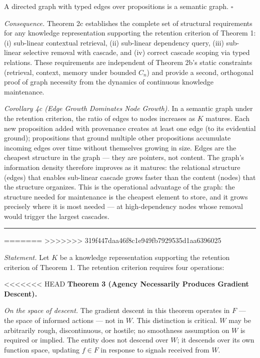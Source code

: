 \documentclass[
]{article}
\begin{document}
A directed graph with typed edges over propositions is a semantic graph.
\(\square\)

\emph{Consequence.} Theorem 2c establishes the complete set of
structural requirements for any knowledge representation supporting the
retention criterion of Theorem 1: (i) sub-linear contextual retrieval,
(ii) sub-linear dependency query, (iii) sub-linear selective removal
with cascade, and (iv) correct cascade scoping via typed relations.
These requirements are independent of Theorem 2b's static constraints
(retrieval, context, memory under bounded \(C_n\)) and provide a second,
orthogonal proof of graph necessity from the dynamics of continuous
knowledge maintenance.

\emph{Corollary 4c (Edge Growth Dominates Node Growth).} In a semantic
graph under the retention criterion, the ratio of edges to nodes
increases as \(K\) matures. Each new proposition added with provenance
creates at least one edge (to its evidential ground); propositions that
ground multiple other propositions accumulate incoming edges over time
without themselves growing in size. Edges are the cheapest structure in
the graph --- they are pointers, not content. The graph's information
density therefore improves as it matures: the relational structure
(edges) that enables sub-linear cascade grows faster than the content
(nodes) that the structure organizes. This is the operational advantage
of the graph: the structure needed for maintenance is the cheapest
element to store, and it grows precisely where it is most needed ---
at high-dependency nodes whose removal would trigger the largest
cascades.

\begin{center}\rule{0.5\linewidth}{0.5pt}\end{center}
=======
>>>>>>> 319f447daa46f8c1e949fb7929535d1aa6396025

\emph{Statement.} Let \(K\) be a knowledge representation supporting the
retention criterion of Theorem 1. The retention criterion requires four
operations:

<<<<<<< HEAD
\textbf{Theorem 3 (Agency Necessarily Produces Gradient Descent).}

\emph{On the space of descent.} The gradient descent in this theorem
operates in \(F\) --- the space of informed actions --- not in \(W\).
This distinction is critical. \(W\) may be arbitrarily rough,
discontinuous, or hostile; no smoothness assumption on \(W\) is required
or implied. The entity does not descend over \(W\); it descends over its
own function space, updating \(f \in F\) in response to signals received
from \(W\).
\end{document}
